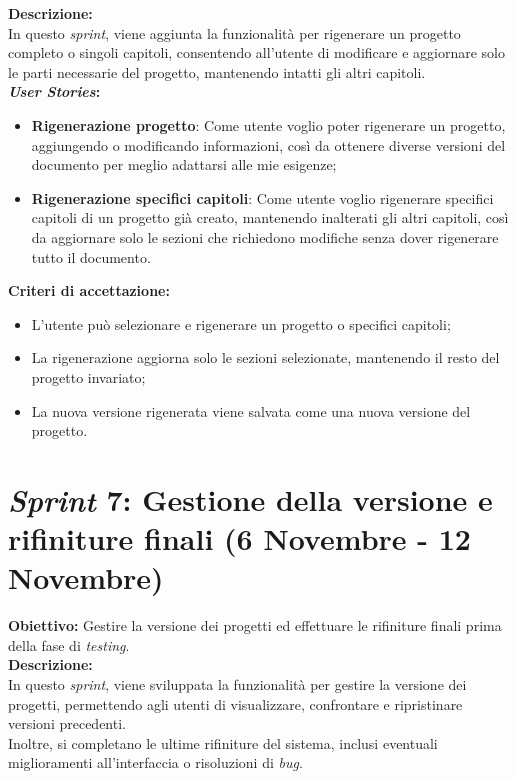 \noindent \textbf{Descrizione:}\\
\noindent In questo \textit{sprint}, viene aggiunta la funzionalità per rigenerare un progetto completo o singoli capitoli, consentendo all'utente di modificare e aggiornare solo le parti necessarie del progetto, mantenendo intatti gli altri capitoli.\\

\noindent \textbf{\textit{User Stories}:} 
\begin{itemize}
    \item \textbf{Rigenerazione progetto}: Come utente voglio poter rigenerare un progetto, aggiungendo o modificando informazioni, così da ottenere diverse versioni del documento per meglio adattarsi alle mie esigenze;
    \item \textbf{Rigenerazione specifici capitoli}: Come utente voglio rigenerare specifici capitoli di un progetto già creato, mantenendo inalterati gli altri capitoli, così da aggiornare solo le sezioni che richiedono modifiche senza dover rigenerare tutto il documento.
\end{itemize}

\noindent \textbf{Criteri di accettazione:}  
\begin{itemize}
    \item L'utente può selezionare e rigenerare un progetto o specifici capitoli;
    \item La rigenerazione aggiorna solo le sezioni selezionate, mantenendo il resto del progetto invariato;
    \item La nuova versione rigenerata viene salvata come una nuova versione del progetto.
\end{itemize}

\section*{\textit{Sprint} 7: Gestione della versione e rifiniture finali (6 Novembre - 12 Novembre)}
\textbf{Obiettivo:} Gestire la versione dei progetti ed effettuare le rifiniture finali prima della fase di \textit{testing}.\\

\noindent \textbf{Descrizione:}\\
\noindent In questo \textit{sprint}, viene sviluppata la funzionalità per gestire la versione dei progetti, permettendo agli utenti di visualizzare, confrontare e ripristinare versioni precedenti.\\
Inoltre, si completano le ultime rifiniture del sistema, inclusi eventuali miglioramenti all'interfaccia o risoluzioni di \textit{bug}.\\

